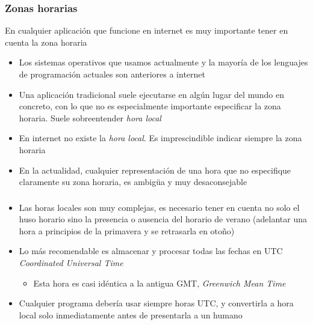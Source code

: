\documentclass[ucs]{beamer}
\begin{document}
\begin{frame}[fragile]
\frametitle{Zonas horarias}
En cualquier aplicación que funcione en internet es muy importante
tener en cuenta la zona horaria
\begin{itemize}
\item
Los sistemas operativos que usamos actualmente y la mayoría de los lenguajes
de programación actuales son anteriores a internet
\item
Una aplicación tradicional suele
ejecutarse en algún lugar del mundo en concreto,  con lo que no es especialmente
importante especificar la zona horaria. Suele sobreentender \emph{hora local}
\item
En internet no existe la \emph{hora local}. Es imprescindible indicar siempre
la zona horaria
\item
En la actualidad, cualquier representación de una hora que no especifique
claramente su zona horaria, es ambigüa y muy desaconsejable

\end{itemize}
\end{frame}



\begin{frame}[fragile]
\frametitle{}
\begin{itemize}

\item
Las horas locales son muy complejas, es necesario tener en cuenta no solo el 
huso horario sino la presencia o ausencia del horario de verano
(adelantar una hora a principios de la primavera y se retrasarla en otoño)

\item
Lo más recomendable es almacenar y procesar todas las fechas en UTC
\emph{Coordinated Universal Time}

\begin{itemize}
\item
Esta hora es casi idéntica a la antigua GMT,
\emph{Greenwich Mean Time}
\end{itemize}

\item
Cualquier programa debería usar siempre horas UTC, y convertirla a hora
local solo inmediatamente antes de presentarla a un humano

\end{itemize}

\end{frame}
\end{document}
